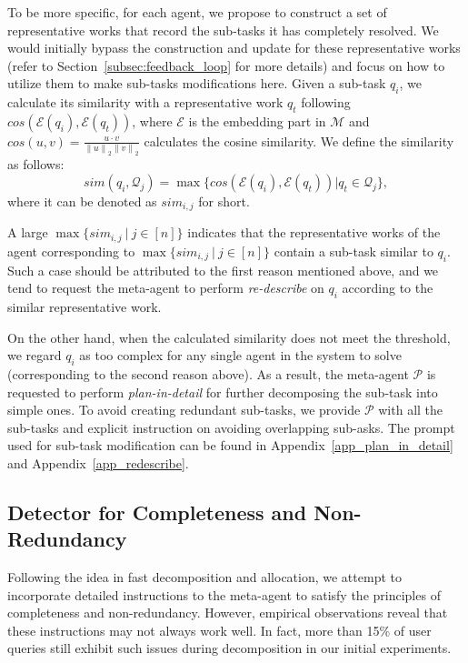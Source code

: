 To be more specific, for each agent, we propose to construct a set of representative works that record the sub-tasks it has completely resolved. We would initially bypass the construction and update for these representative works (refer to Section~\ref{subsec:feedback_loop} for more details) and focus on how to utilize them to make sub-tasks modifications here.
Given a sub-task $q_i$, we calculate its similarity with a representative work $q_t$ following $cos(\mathcal{E}(q_i), \mathcal{E}(q_t))$, where $\mathcal{E}$ is the embedding part in $\mathcal{M}$ and $cos(u,v) = \frac{u\cdot v}{\left\|u\right\|_2\left\|v\right\|_2}$ calculates the cosine similarity. We define the similarity as follows:
\begin{equation}
sim(q_i, \mathcal{Q}_j)=\max\{cos(\mathcal{E}(q_i), \mathcal{E}(q_t))|q_t\in \mathcal{Q}_j\},
\end{equation}
where it can be denoted as $sim_{i,j}$ for short. 

A large $\max\{sim_{i,j}\ |\ j\in[n]\}$ indicates that the representative works of the agent corresponding to $\max\{sim_{i,j}\ |\ j\in[n]\}$ contain a sub-task similar to $q_i$. Such a case should be attributed to the first reason mentioned above, and we tend to request the meta-agent to perform {\it re-describe} on $q_i$ according to the similar representative work.

On the other hand, when the calculated similarity does not meet the threshold, we regard $q_i$ as too complex for any single agent in the system to solve (corresponding to the second reason above). As a result, the meta-agent $\mathcal{P}$ is requested to perform {\it plan-in-detail} for further decomposing the sub-task into simple ones.
To avoid creating redundant sub-tasks, we provide $\mathcal{P}$ with all the sub-tasks and explicit instruction on avoiding overlapping sub-asks. The prompt used for sub-task modification can be found in Appendix~\ref{app_plan_in_detail} and Appendix~\ref{app_redescribe}.



\subsection{Detector for Completeness and Non-Redundancy}
\label{subsec:detector}
Following the idea in fast decomposition and allocation, we attempt to incorporate detailed instructions to the meta-agent to satisfy the principles of completeness and non-redundancy.
However, empirical observations reveal that these instructions may not always work well. In fact, more than 15\% of user queries still exhibit such issues during decomposition in our initial experiments.

